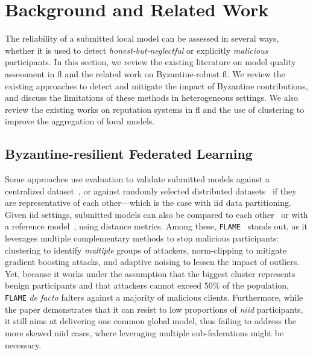 \section{Background and Related Work\label{sec:radar.related}}

The reliability of a submitted local model can be assessed in several ways, whether it is used to detect \emph{honest-but-neglectful} or explicitly \emph{malicious} participants.
In this section, we review the existing literature on model quality assessment in \gls{fl} and the related work on Byzantine-robust \gls{fl}.
We review the existing approaches to detect and mitigate the impact of Byzantine contributions, and discuss the limitations of these methods in heterogeneous settings.
We also review the existing works on reputation systems in \gls{fl} and the use of clustering to improve the aggregation of local models.


\subsection{Byzantine-resilient Federated Learning\label{sec:radar.related.byzantine}}

Some approaches use evaluation to validate submitted models against a centralized dataset~\cite{cao_FLTrustByzantinerobustFederated_2022}, or against randomly selected distributed datasets~\cite{pejo_QualityInferenceFederated_2023} if they are representative of each other---which is the case with \gls{iid} data partitioning.
Given \gls{iid} settings, submitted models can also be compared to each other~\cite{blanchard_Machinelearningadversaries_2017,cao_FLTrustByzantinerobustFederated_2022,nguyen_FLAMETamingBackdoors_2022} or with a reference model~\cite{xia_ToFiAlgorithmDefend_2021,zhou_DifferentiallyPrivateFederated_2022}, using distance metrics.
Among these, \texttt{FLAME}~\cite{nguyen_FLAMETamingBackdoors_2022} stands out, as it leverages multiple complementary methods to stop malicious participants: clustering to identify \emph{multiple} groups of attackers, norm-clipping to mitigate gradient boosting attacks, and adaptive noising to lessen the impact of outliers.
Yet, because it works under the assumption that the biggest cluster represents benign participants and that attackers cannot exceed 50\% of the population, \texttt{FLAME} \emph{de facto} falters against a majority of malicious clients.
Furthermore, while the paper demonstrates that it can resist to low proportions of \emph{\gls{niid}} participants, it still aims at delivering one common global model, thus failing to address the more skewed \gls{niid} cases, where leveraging multiple sub-federations might be necessary.

